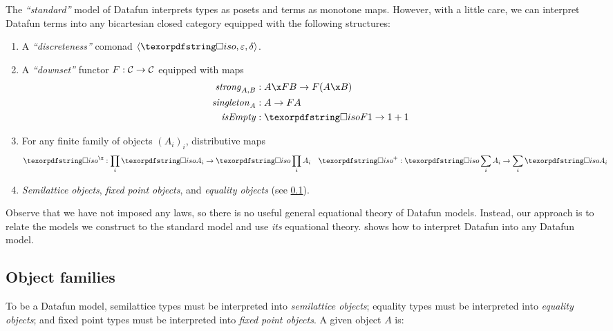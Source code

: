 \documentclass{rntz}\usepackage{fantasy}\geometry{textwidth=330pt,}
\begin{document}
The \emph{``standard''} model of Datafun interprets types as posets and terms as
monotone maps. However, with a little care, we can interpret Datafun terms into
any bicartesian closed category \catC{} equipped with the following structures:

\begin{enumerate}
\item A \emph{``discreteness''} comonad $\tuple{\disco{}, \varepsilon, \delta}$.

\item A \emph{``downset''} functor \(F : \mathcal{C} \to \mathcal{C}\) equipped with
  maps
  \begin{align*}
    \morph{strong}_{A,B} &: A \x \downof{B} \to \downof{(A \x B)}\\
    \morph{singleton}_A &: A \to \downof{A}\\
    \morph{isEmpty} &: \discof{\downof{\termO}} \to \termO + \termO
  \end{align*}

\item For any finite family of objects $(A_i)_i$, distributive maps
  \begin{align*}
    \disco^\x &: \prod_i \discof{A_i} \to \disco \prod_i A_i
    &
    \disco^+ &: \disco \sum_i A_i \to \sum_i \discof{A_i}
  \end{align*}

\item \emph{Semilattice objects}, \emph{fixed point objects}, and \emph{equality
  objects} (see \cref{sec:object-families}).

\end{enumerate}

\noindent
Observe that we have not imposed any laws, so there is no useful general
equational theory of Datafun models. Instead, our approach is to relate the
models we construct to the standard \Poset{} model and use \emph{its} equational
theory.  shows how to interpret Datafun into any
Datafun model.


\subsection{Object families}
\label{sec:object-families}

To be a Datafun model, semilattice types must be interpreted into
\emph{semilattice objects}; equality types must be interpreted into
\emph{equality objects}; and fixed point types must be interpreted into
\emph{fixed point objects}. A given object $A$ is:
\end{document}
